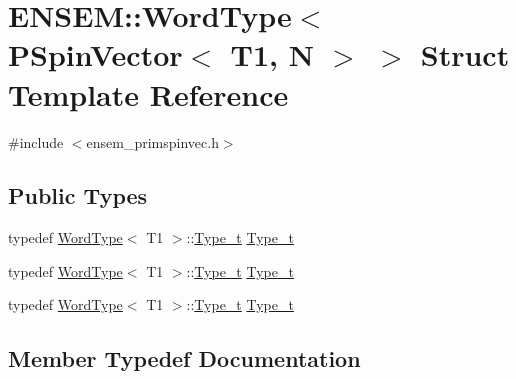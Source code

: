 \hypertarget{structENSEM_1_1WordType_3_01PSpinVector_3_01T1_00_01N_01_4_01_4}{}\section{E\+N\+S\+EM\+:\+:Word\+Type$<$ P\+Spin\+Vector$<$ T1, N $>$ $>$ Struct Template Reference}
\label{structENSEM_1_1WordType_3_01PSpinVector_3_01T1_00_01N_01_4_01_4}


{\ttfamily \#include $<$ensem\+\_\+primspinvec.\+h$>$}

\subsection*{Public Types}
\begin{DoxyCompactItemize}
\item 
typedef \mbox{\hyperlink{structENSEM_1_1WordType}{Word\+Type}}$<$ T1 $>$\+::\mbox{\hyperlink{structENSEM_1_1WordType_3_01PSpinVector_3_01T1_00_01N_01_4_01_4_addbb91e7d2c1c1c79f012acf1cd02ce3}{Type\+\_\+t}} \mbox{\hyperlink{structENSEM_1_1WordType_3_01PSpinVector_3_01T1_00_01N_01_4_01_4_addbb91e7d2c1c1c79f012acf1cd02ce3}{Type\+\_\+t}}
\item 
typedef \mbox{\hyperlink{structENSEM_1_1WordType}{Word\+Type}}$<$ T1 $>$\+::\mbox{\hyperlink{structENSEM_1_1WordType_3_01PSpinVector_3_01T1_00_01N_01_4_01_4_addbb91e7d2c1c1c79f012acf1cd02ce3}{Type\+\_\+t}} \mbox{\hyperlink{structENSEM_1_1WordType_3_01PSpinVector_3_01T1_00_01N_01_4_01_4_addbb91e7d2c1c1c79f012acf1cd02ce3}{Type\+\_\+t}}
\item 
typedef \mbox{\hyperlink{structENSEM_1_1WordType}{Word\+Type}}$<$ T1 $>$\+::\mbox{\hyperlink{structENSEM_1_1WordType_3_01PSpinVector_3_01T1_00_01N_01_4_01_4_addbb91e7d2c1c1c79f012acf1cd02ce3}{Type\+\_\+t}} \mbox{\hyperlink{structENSEM_1_1WordType_3_01PSpinVector_3_01T1_00_01N_01_4_01_4_addbb91e7d2c1c1c79f012acf1cd02ce3}{Type\+\_\+t}}
\end{DoxyCompactItemize}


\subsection{Member Typedef Documentation}
\mbox{\label{structENSEM_1_1WordType_3_01PSpinVector_3_01T1_00_01N_01_4_01_4_addbb91e7d2c1c1c79f012acf1cd02ce3}} 
